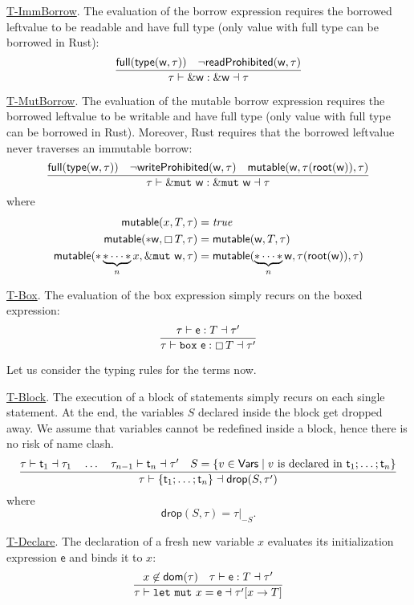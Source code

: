 \underline{\textsf{T-ImmBorrow}}.
The evaluation of the borrow expression requires the borrowed leftvalue
to be readable and have full type
(only value with full type can be borrowed in Rust):
\[
\frac
    {\mathsf{full}(\mathsf{type}(\mathsf{w},\tau))\quad\neg\mathsf{readProhibited}(\mathsf{w},\tau)}
    {\tau\vdash\&\mathsf{w}:\&\mathsf{w}\dashv\tau}
\]

\underline{\textsf{T-MutBorrow}}.
The evaluation of the mutable borrow expression requires the borrowed
leftvalue to be writable and have full type
(only value with full type can be borrowed in Rust). Moreover, Rust requires that
the borrowed leftvalue never traverses an immutable borrow:
\[
\frac
    {\mathsf{full}(\mathsf{type}(\mathsf{w},\tau))\quad\neg\mathsf{writeProhibited}(\mathsf{w},\tau)
    \quad\mathsf{mutable}(\mathsf{w},\tau(\mathsf{root}(\mathsf{w})),\tau)}
    {\tau\vdash\&\mathtt{mut}\ \mathsf{w}:\&\mathtt{mut}\ \mathsf{w}\dashv\tau}
\]
where
\begin{align*}
  \mathsf{mutable}(x,T,\tau)&=\mathit{true}\\
  \mathsf{mutable}(\mathtt{*}\mathsf{w},\boxempty\,{T},\tau)&=\mathsf{mutable}(\mathsf{w},T,\tau)\\
  \mathsf{mutable}(\mathtt{*}\underbrace{\mathtt{*}\cdots\mathtt{*}}_nx,
  \&\mathtt{mut}\ \mathsf{w},\tau)&=\mathsf{mutable}(\underbrace{\mathtt{*}\cdots\mathtt{*}}_n\mathsf{w},
  \tau(\mathsf{root}(\mathsf{w})),\tau)
\end{align*}

\underline{\textsf{T-Box}}.
The evaluation of the box expression simply recurs on the boxed expression:
\[
\frac
    {\tau\vdash\mathsf{e}:T\dashv\tau'}
    {\tau\vdash\mathtt{box}\ \mathsf{e}:\boxtype{T}\dashv\tau'}
\]

Let us consider the typing rules for the terms now.

\underline{\textsf{T-Block}}.
The execution of a block of statements simply recurs on each single statement.
At the end, the variables $S$ declared inside the block get dropped away. We assume
that variables cannot be redefined inside a block, hence there is no risk of name clash.
\[
\frac
    {\tau\vdash\mathsf{t}_1\dashv\tau_1\quad\ldots\quad\tau_{n-1}\vdash\mathsf{t}_n\dashv\tau'
    \quad S=\{v\in\mathsf{Vars}\mid v\text{ is declared in }\mathsf{t}_1;\ldots;\mathsf{t}_n\}}
    {\tau\vdash\{\mathsf{t}_1;\ldots;\mathsf{t}_n\}\dashv\mathsf{drop}(S,\tau')}
\]
where
\[
\mathsf{drop}(S,\tau)=\tau|_{-S}.
\]

\underline{\textsf{T-Declare}}.
The declaration of a fresh new variable $x$ evaluates its initialization expression $\mathsf{e}$ and
binds it to $x$:
\[
\frac
    {x\not\in\mathsf{dom}(\tau)\quad\tau\vdash\mathsf{e}:T\dashv\tau'}
    {\tau\vdash\mathtt{let\ mut}\ x=\mathsf{e}\dashv\tau'[x\to T]}
\]

